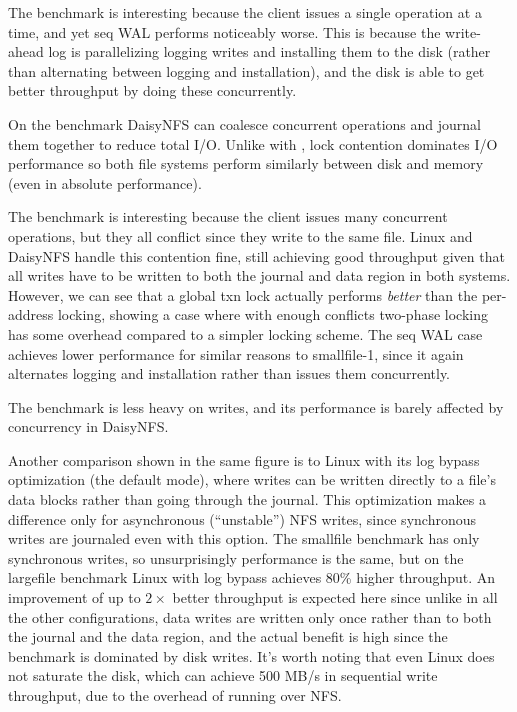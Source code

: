 The  benchmark is interesting because the client issues a single
operation at a time, and yet seq WAL performs noticeably worse. This is because
the write-ahead log is parallelizing logging writes and installing them to the
disk (rather than alternating between logging and installation), and the disk is
able to get better throughput by doing these concurrently.

On the  benchmark DaisyNFS can coalesce concurrent operations
and journal them together to reduce total I/O. Unlike with ,
lock contention dominates I/O performance so both file systems perform similarly
between disk and memory (even in absolute performance).

The  benchmark is interesting because the client issues many
concurrent operations, but they all conflict since they write to the same file.
Linux and DaisyNFS handle this contention fine, still achieving good throughput
given that all writes have to be written to both the journal and data region in
both systems. However, we can see that a global txn lock actually performs
\emph{better} than the per-address locking, showing a case where with enough
conflicts two-phase locking has some overhead compared to a simpler locking
scheme. The seq WAL case achieves lower performance for similar reasons to
smallfile-1, since it again alternates logging and installation rather than
issues them concurrently.

The  benchmark is less heavy on writes, and its performance
is barely affected by concurrency in DaisyNFS.

Another comparison shown in the same figure is to Linux with its log bypass
optimization (the default  mode), where writes can be written
directly to a file's data blocks rather than going through the journal. This optimization
makes a difference only for asynchronous (``unstable'') NFS writes, since synchronous writes
are journaled even with this option. The smallfile benchmark has only
synchronous writes, so unsurprisingly performance is the same, but on the
largefile benchmark Linux with log bypass achieves 80\% higher throughput. An
improvement of up to $2\times$ better throughput is expected here since unlike
in all the other configurations, data writes are written only once rather than
to both the journal and the data region, and the actual benefit is high since
the benchmark is dominated by disk writes. It's worth noting that even Linux
does not saturate the disk, which can achieve 500 MB/s in sequential write
throughput, due to the overhead of running over NFS.

